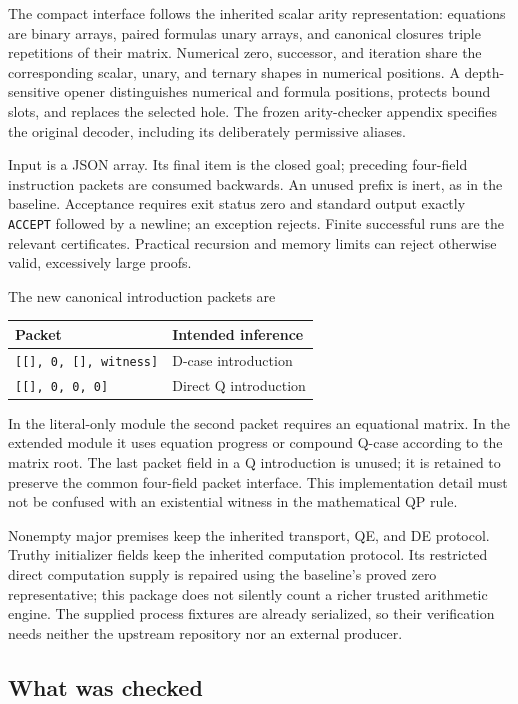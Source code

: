 \documentclass[11pt]{article}
\theoremstyle{definition}
\begin{document}
The compact interface follows the inherited scalar arity representation:
equations are binary arrays, paired formulas unary arrays, and canonical
closures triple repetitions of their matrix. Numerical zero, successor, and
iteration share the corresponding scalar, unary, and ternary shapes in
numerical positions. A depth-sensitive opener distinguishes numerical and
formula positions, protects bound slots, and replaces the selected hole.
The frozen arity-checker appendix specifies the original decoder, including
its deliberately permissive aliases.

Input is a JSON array. Its final item is the closed goal; preceding
four-field instruction packets are consumed backwards. An unused prefix is
inert, as in the baseline. Acceptance requires exit status zero and standard
output exactly \texttt{ACCEPT} followed by a newline; an exception rejects.
Finite successful runs are the relevant certificates. Practical recursion
and memory limits can reject otherwise valid, excessively large proofs.

The new canonical introduction packets are
\begin{center}
\begin{tabular}{@{}ll@{}}
\toprule
Packet & Intended inference \\
\midrule
\texttt{[[], 0, [], witness]} & D-case introduction \\
\texttt{[[], 0, 0, 0]} & Direct Q introduction \\
\bottomrule
\end{tabular}
\end{center}
In the literal-only module the second packet requires an equational matrix.
In the extended module it uses equation progress or compound Q-case according
to the matrix root. The last packet field in a Q introduction is unused;
it is retained to preserve the common four-field packet interface. This
implementation detail must not be confused with an existential witness in
the mathematical QP rule.

Nonempty major premises keep the inherited transport, QE, and DE protocol.
Truthy initializer fields keep the inherited computation protocol. Its
restricted direct computation supply is repaired using the baseline's proved
zero representative; this package does not silently count a richer trusted
arithmetic engine. The supplied process fixtures are already serialized, so
their verification needs neither the upstream repository nor an external
producer.

\subsection{What was checked}
\end{document}
